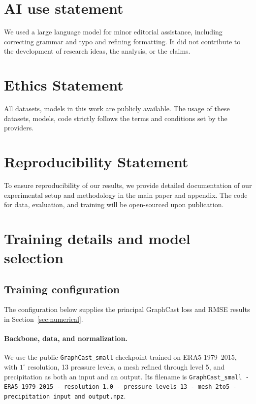 \documentclass{article}
\newcommand{\suozhi}[1]{}
\renewcommand{\suozhi}[1]{}
\newcommand{\vfourchange}[1]{{\color{blue}#1}}
\begin{document}
\section*{AI use statement}

We used a large language model for minor editorial assistance, including correcting grammar and
typo and refining formatting. It did not contribute to the development of research ideas, the analysis,
or the claims.

\section*{Ethics Statement}
All datasets, models in this work are publicly available. The usage of these datasets, models, code strictly follows the terms and conditions set by the providers. 

\section*{Reproducibility Statement}
To ensure reproducibility of our results, we provide detailed documentation of our experimental setup and methodology in the main paper and appendix. The code for data, evaluation,
and training will be open-sourced upon publication.






\clearpage
\appendix

\section{\texorpdfstring{{Training details and model selection}}{Training details and model selection}}
\label{app:training}

\subsection{Training configuration}
\label{app:training_configuration}
The configuration below supplies the principal {GraphCast loss} and RMSE results in Section~\ref{sec:numerical}.

\paragraph{\vfourchange{Backbone, data, and normalization.}}
\vfourchange{We use the public \texttt{GraphCast\_small} checkpoint trained on ERA5 1979--2015, with $1^\circ$ resolution, 13 pressure levels, a mesh refined through level 5, and precipitation as both an input and an output. Its filename is {\small\texttt{GraphCast\_small - ERA5 1979-2015 - resolution 1.0 - pressure levels 13 - mesh 2to5 - precipitation input and output.npz}}.}
\end{document}
